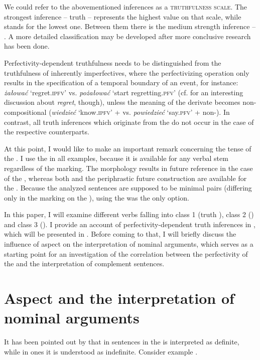 \documentclass[output=paper,  modfonts,  newtxmath,  hidelinks		  ]{langscibook}
\begin{document}
We could refer to the abovementioned inferences as a \textsc{truthfulness scale}. The strongest inference -- truth  -- represents the highest value on that scale, while  stands for the lowest one. Between them there is the medium strength inference -- . A more detailed classification may be developed after more conclusive research has been done.

Perfectivity-dependent truthfulness needs to be distinguished from the truthfulness of inherently  imperfectives, where the perfectivizing operation only results in the specification of a temporal boundary of an event, for instance: \textit{żałować} `regret.\textsc{ipfv}’ vs. \textit{pożałować} `start regretting.\textsc{pfv}’ (cf. \citealt{Egré2008} for an interesting discussion about \textit{regret}, though), unless the meaning of the derivate becomes non-compositional (\textit{wiedzieć}
`know.\textsc{ipfv}’ +  vs. \textit{powiedzieć} `say.\textsc{pfv}’ + non-). In contrast, all truth inferences which originate from the  do not occur in the case of the respective  counterparts.\par At this point, I would like to make an important remark concerning the tense of the . I use the  in all examples, because it is available for any verbal stem regardless of the  marking. The  morphology results in future reference in the case of the , whereas both  and the periphrastic future construction are available for the . Because the analyzed sentences are supposed to be minimal pairs (differing only in the  marking on the ), using the  was the only option.\par In this paper, I will examine different verbs falling into class 1 (truth ), class 2 () and class 3 (). I provide an account of perfectivity-dependent truth inferences in , which will be presented in . Before coming to that, I will briefly discuss the influence of aspect on the interpretation of nominal arguments, which serves as a starting point for an investigation of the correlation between the perfectivity of the  and the interpretation of complement sentences.

\section{Aspect and the interpretation of nominal arguments}
It has been pointed out by \cite{Wierzbicka1967} that in  sentences in  the  is interpreted as definite, while in  ones it is understood as indefinite. Consider example .
\end{document}
